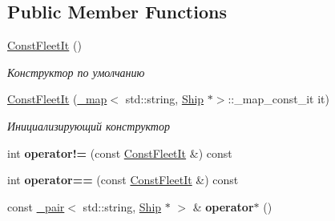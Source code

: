 \subsection*{Public Member Functions}
\begin{DoxyCompactItemize}
\item 
\mbox{\label{class_aircraft_carrier_group_1_1_const_fleet_it_a4813f5fe58d256d4dccc8ba7c1425b5c}} 
\mbox{\hyperlink{class_aircraft_carrier_group_1_1_const_fleet_it_a4813f5fe58d256d4dccc8ba7c1425b5c}{Const\+Fleet\+It}} ()
\begin{DoxyCompactList}\small\item\em Конструктор по умолчанию \end{DoxyCompactList}\item 
\mbox{\hyperlink{class_aircraft_carrier_group_1_1_const_fleet_it_a7e7d3013d5dada354b4b39b5566d096f}{Const\+Fleet\+It}} (\mbox{\hyperlink{class__map}{\+\_\+map}}$<$ std\+::string, \mbox{\hyperlink{class_aircraft_carrier_group_1_1_ship}{Ship}} $\ast$$>$\+::\+\_\+map\+\_\+const\+\_\+it it)
\begin{DoxyCompactList}\small\item\em Инициализирующий конструктор \end{DoxyCompactList}\item 
\mbox{\label{class_aircraft_carrier_group_1_1_const_fleet_it_a83aac6a7725d7ead768706048f89f0e3}} 
int {\bfseries operator!=} (const \mbox{\hyperlink{class_aircraft_carrier_group_1_1_const_fleet_it}{Const\+Fleet\+It}} \&) const
\item 
\mbox{\label{class_aircraft_carrier_group_1_1_const_fleet_it_ac050e45aa19318a687db19798d4ec555}} 
int {\bfseries operator==} (const \mbox{\hyperlink{class_aircraft_carrier_group_1_1_const_fleet_it}{Const\+Fleet\+It}} \&) const
\item 
\mbox{\label{class_aircraft_carrier_group_1_1_const_fleet_it_addc1d662e39282c0ffc730c5121b699b}} 
const \mbox{\hyperlink{struct__pair}{\+\_\+pair}}$<$ std\+::string, \mbox{\hyperlink{class_aircraft_carrier_group_1_1_ship}{Ship}} $\ast$ $>$ \& {\bfseries operator$\ast$} ()
\item 
\mbox{\label{class_aircraft_carrier_group_1_1_const_fleet_it_afddb11222693e0b902a92368ff15c9db}} 
$$
\end{DoxyCompactItemize}
